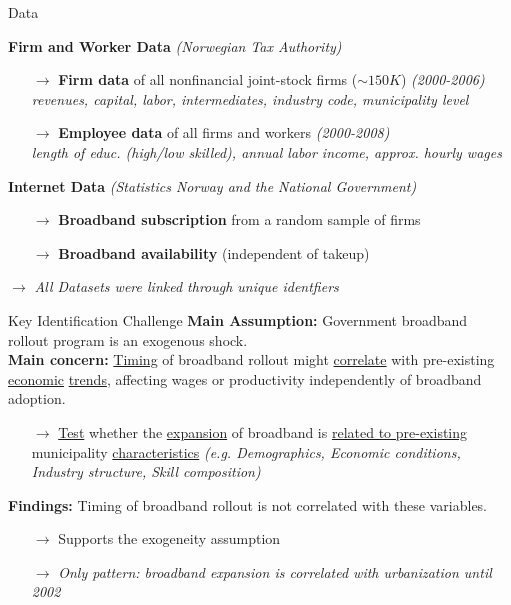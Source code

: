 \documentclass[compress, aspectratio=169, xcolor=dvipsnames]{beamer}
\begin{document}
\begin{frame}{Data}
	
	\begin{block}{\textbf{Firm and Worker Data} \textit{(Norwegian Tax Authority)}} 
		\begin{itemize}
			\item[$\rightarrow$] \textbf{Firm data} of all nonfinancial joint-stock firms ($\sim 150 K$) \textit{(2000-2006)} \\
			\textit{revenues, capital, labor, intermediates, industry code, municipality level}
			\item[$\rightarrow$] \textbf{Employee data} of all firms and workers \textit{(2000-2008)} \\
			\textit{length of educ. (high/low skilled), annual labor income, approx. hourly wages}
			\end{itemize}
	\end{block}
	\begin{block}{\textbf{Internet Data} \textit{(Statistics Norway and the National Government)}} 
	\begin{itemize}
		\item[$\rightarrow$] \textbf{Broadband subscription} from a random sample of firms
		\item[$\rightarrow$] \textbf{Broadband availability} (independent of takeup)
	\end{itemize}
	\end{block}
	$\rightarrow$ \textit{All Datasets were linked through unique identfiers}

\end{frame}

\begin{frame}{Key Identification Challenge}
\textbf{Main Assumption:} Government broadband rollout program is an exogenous shock. \\
\vspace{10pt}
\textbf{Main concern:} \underline{Timing} of broadband rollout might \underline{correlate} with pre-existing \underline{economic} \underline{trends}, affecting wages or productivity independently of broadband adoption. \\


	\begin{itemize}
		\item[$\rightarrow$] \underline{Test} whether the \underline{expansion} of broadband is \underline{related to pre-existing} municipality \underline{characteristics} \textit{(e.g. Demographics, Economic conditions, Industry structure, Skill composition)}
	\end{itemize}
	\vspace{10pt}
	\textbf{Findings:} Timing of broadband rollout is not correlated with these variables.
	\begin{itemize}
		\item[$\rightarrow$] Supports the exogeneity assumption
		\item[$\rightarrow$]\textit{Only pattern: broadband expansion is correlated with urbanization until 2002}
	\end{itemize}
	
	
\end{frame}
\end{document}
